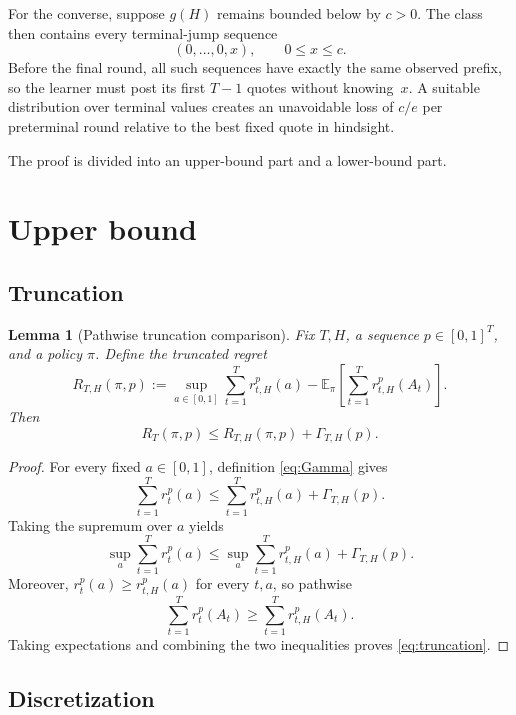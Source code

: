 \documentclass[11pt]{article}
\newtheorem{lemma}[theorem]{Lemma}
\theoremstyle{remark}
\newcommand{\E}{\mathbb{E}}
\newcommand{\GammaTail}{\Gamma}
\begin{document}
For the converse, suppose $g(H)$ remains bounded below by $c>0$.  The class then
contains every terminal-jump sequence
\[
    (0,\ldots,0,x),\qquad 0\le x\le c.
\]
Before the final round, all such sequences have exactly the same observed prefix,
so the learner must post its first $T-1$ quotes without knowing~$x$.  A suitable
distribution over terminal values creates an unavoidable loss of $c/e$ per
preterminal round relative to the best fixed quote in hindsight.

The proof is divided into an upper-bound part and a lower-bound part.

\section{Upper bound}

\subsection{Truncation}

\begin{lemma}[Pathwise truncation comparison]\label{lem:truncation}
Fix $T,H$, a sequence $p\in[0,1]^T$, and a policy $\pi$.  Define the truncated
regret
\[
    R_{T,H}(\pi,p)
    :=
    \sup_{a\in[0,1]}
    \sum_{t=1}^T r_{t,H}^p(a)
    -
    \E_\pi\!\left[\sum_{t=1}^T r_{t,H}^p(A_t)\right].
\]
Then
\begin{equation}\label{eq:truncation}
    R_T(\pi,p)
    \le
    R_{T,H}(\pi,p)+\GammaTail_{T,H}(p).
\end{equation}
\end{lemma}

\begin{proof}
For every fixed $a\in[0,1]$, definition \eqref{eq:Gamma} gives
\[
    \sum_{t=1}^T r_t^p(a)
    \le
    \sum_{t=1}^T r_{t,H}^p(a)
    +\GammaTail_{T,H}(p).
\]
Taking the supremum over $a$ yields
\[
    \sup_a\sum_{t=1}^T r_t^p(a)
    \le
    \sup_a\sum_{t=1}^T r_{t,H}^p(a)
    +\GammaTail_{T,H}(p).
\]
Moreover, $r_t^p(a)\ge r_{t,H}^p(a)$ for every $t,a$, so pathwise
\[
    \sum_{t=1}^T r_t^p(A_t)
    \ge
    \sum_{t=1}^T r_{t,H}^p(A_t).
\]
Taking expectations and combining the two inequalities proves
\eqref{eq:truncation}.
\end{proof}

\subsection{Discretization}
\end{document}
